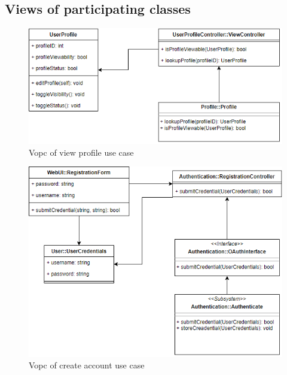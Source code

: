 \documentclass[a4paper]{article}
\begin{document}
\subsection{Views of participating classes}
\begin{figure}[H]
  \centering
  \includegraphics[width=1.0\textwidth]{vopc_view_profile.png}
  \caption{Vopc of view profile use case}
  \label{fig:fig21}
\end{figure}

\begin{figure}[H]
  \centering
  \includegraphics[width=1.0\textwidth]{vopc_register.png}
  \caption{Vopc of create account use case}
  \label{fig:fig22}
\end{figure}
\end{document}
